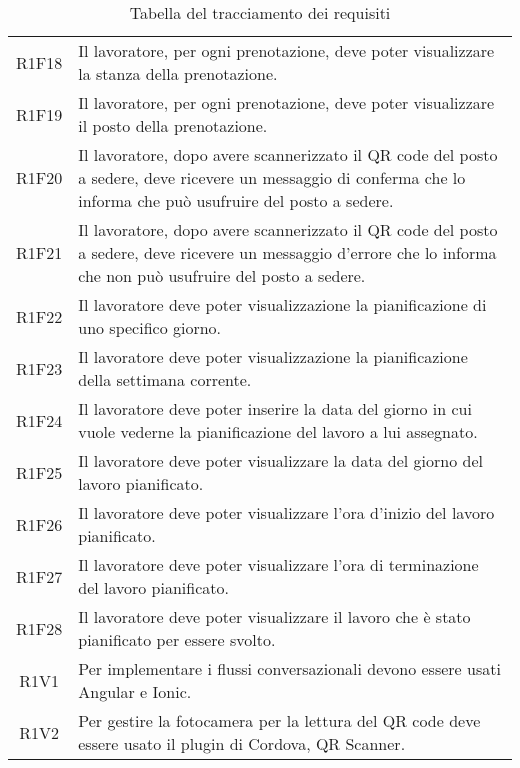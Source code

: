 \begin{table}[h]%
	\centering
	\begin{tabularx}{\textwidth}{c X}
		\hline		
		\rowcolor{giallo}
		\intest{Codice} &  \intest{Descrizione} \\	
		\hline	
		R1F18 & Il lavoratore, per ogni prenotazione, deve poter visualizzare la stanza della prenotazione.\\
		R1F19 & Il lavoratore, per ogni prenotazione, deve poter visualizzare il posto della prenotazione.\\	
		R1F20 & Il lavoratore, dopo avere scannerizzato il \gls{QR code}\ap{[g]} del posto a sedere, deve ricevere un messaggio di conferma che lo informa che può usufruire del posto a sedere.\\
		R1F21 & Il lavoratore, dopo avere scannerizzato il \gls{QR code}\ap{[g]} del posto a sedere, deve ricevere un messaggio d'errore che lo informa che non può usufruire del posto a sedere.\\
		R1F22 & Il lavoratore deve poter visualizzazione la pianificazione di uno specifico giorno.\\
		R1F23 & Il lavoratore deve poter visualizzazione la pianificazione della settimana corrente.\\
		R1F24 & Il lavoratore deve poter inserire la data del giorno in cui vuole vederne la pianificazione del lavoro a lui assegnato.\\
		R1F25 & Il lavoratore deve poter visualizzare la data del giorno del lavoro pianificato.\\
		R1F26 & Il lavoratore deve poter visualizzare l'ora d'inizio del lavoro pianificato.\\
		R1F27 & Il lavoratore deve poter visualizzare l'ora di terminazione del lavoro pianificato.\\
		R1F28 & Il lavoratore deve poter visualizzare il lavoro che è stato pianificato per essere svolto.\\
		R1V1 & Per implementare i flussi conversazionali devono essere usati Angular e Ionic.\\
		R1V2 & Per gestire la fotocamera per la lettura del \gls{QR code}\ap{[g]} deve essere usato il plugin di Cordova, QR Scanner.\\
		
		\hline	
	\end{tabularx} \hbox{}
	\caption{Tabella del tracciamento dei requisiti}
\end{table}%
